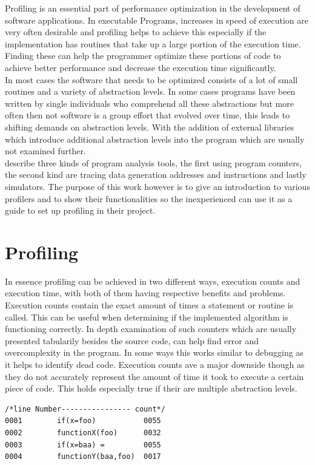 Profiling is an essential part of performance optimization in the development of software applications. In executable Programs, increases in speed of execution are very often desirable and profiling helps to achieve this especially if the implementation has routines that take up a large portion of the execution time. Finding these can help the programmer optimize these portions of code to achieve better performance and decrease the execution time significantly. \\
In most cases the software that needs to be optimized consists of a lot of small routines and a variety of abstraction levels. In some cases programs have been written by single individuals who comprehend all these abstractions but more often then not software is a group effort that evolved over time, this leads to shifting demands on abstraction levels. With the addition of external libraries which introduce additional abstraction levels into the program which are usually not examined further.\citep{graham_gprof:_1982}\\
 \cite{srivastava_atom:_2004} describe three kinds of program analysis tools, the first using program counters, the second kind are tracing data generation addresses and instructions and lastly simulators.
 The purpose of this work however is to give an introduction to various profilers and to show their functionalities so the inexperienced can use it as a guide to set up profiling in their project.
\section{Profiling} \label{sec:Introduction}

In essence profiling can be achieved in two different ways, execution counts and execution time, with both of them having respective benefits and problems.\\
Execution counts contain the exact amount of times a statement or routine is called. This can be useful when determining if the implemented algorithm is functioning correctly. In depth examination of such counters which are usually presented tabularily besides the source code, can help find error and overcomplexity in the program. In some ways this works similar to debugging as it helps to identify dead code. Execution counts ave a major downside though as they do not accurately represent the amount of time it took to execute a certain piece of code. This holds especially true if their are multiple abstraction levels.

\begin{lstlisting}[label={list:first},caption= Call Count example]
/*line Number---------------- count*/             
0001        if(x=foo)           0055
0002        functionX(foo)      0032
0003        if(x=baa) =         0055
0004        functionY(baa,foo)  0017
\end{lstlisting}

